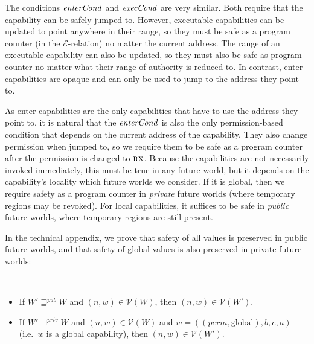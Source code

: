 \documentclass[format=acmsmall, review=false, screen=true]{acmart}
\newcommand{\var}[1]{\mathit{#1}}
\newcommand{\gl}{\var{g}}
\newcommand{\addr}{\var{a}}
\newcommand{\start}{\var{b}}
\newcommand{\addrend}{\var{e}}
\newcommand{\perm}{\var{perm}}
\newcommand{\stdcap}[1][(\perm,\gl)]{\left(#1,\start,\addrend,\addr \right)}
\newcommand{\plainfun}[2]{
  \ifthenelse{\equal{#2}{}}
  {\mathit{#1}}
  {\mathit{#1}(#2)}
}
\newcommand{\execCond}[1]{\plainfun{execCond}{#1}}
\newcommand{\entryCond}[1]{\plainfun{enterCond}{#1}}
\newcommand{\futurewk}{\mathbin{\sqsupseteq}^{\var{pub}}}
\newcommand{\futurestr}{\mathbin{\sqsupseteq}^{\var{priv}}}
\newcommand{\asmType}{\plaindom{AsmType}}
\newcommand{\plaindom}[1]{\mathrm{#1}}
\newcommand{\intr}[2]{\mathcal{#1}}
\newcommand{\valueintr}[1]{\intr{V}{#1}}
\newcommand{\exprintr}[1]{\intr{E}{#1}}
\newcommand{\stdvr}{\valueintr{\asmType}}
\newcommand{\stder}{\exprintr{\asmType}}
\newcommand{\npair}[2][n]{\left(#1,#2 \right)}
\newcommand{\plainperm}[1]{\textsc{#1}}
\newcommand{\exec}{\plainperm{rx}}
\newcommand{\plainlocality}[1]{\mathrm{#1}}
\newcommand{\glob}{\plainlocality{global}}
\newenvironment{toplas}
    {\color{OliveGreen}
          
    }{}
\newcommand{\itoplassug}[1]
    {{\color{Blue} #1}}
\begin{document}
The conditions $\entryCond{}$ and $\execCond{}$ are very similar. Both require
that the capability can be safely jumped to. However, executable capabilities
can be updated to point anywhere in their range, so they must be safe as a
program counter (in the $\stder$-relation) no matter the current address.
\itoplassug{The range of an executable capability can also be updated, so they must also be safe as program counter no matter what their range of authority is reduced to.}
In contrast, enter capabilities are opaque and can only be used to jump to the
address they point to.
\begin{toplas}
  As enter capabilities are the only capabilities that have to use the address they point to, it is natural that the $\entryCond{}$ is also the only permission-based condition that depends on the current address of the capability.
\end{toplas}
They also change permission when jumped to, so we require
them to be safe as a program counter after the permission is changed to $\exec$.
Because the capabilities are not necessarily invoked immediately, this must be
true in any future world, but it depends on the capability's locality which
future worlds we consider. If it is global, then we require safety as a program
counter in \emph{private} future worlds (where temporary regions may be
revoked). For local capabilities, it suffices to be safe in \emph{public} future
worlds, where temporary regions are still present.

In the technical appendix, we prove that safety of all values is
preserved in public future worlds, and that safety of global values is
also preserved in private future worlds:
\begin{lemma}~
  \begin{itemize}
  \item If $W' \futurewk W$ and $\npair{w} \in \stdvr(W)$, then $\npair{w} \in
    \stdvr(W')$.
  \item If $W' \futurestr W$ and $\npair{w} \in \stdvr(W)$ and $w =
    \stdcap[(\perm,\glob)]$ (i.e.\ $w$ is a global capability), then $\npair{w}
    \in \stdvr(W')$.
  \end{itemize}
\end{lemma}
\end{document}
